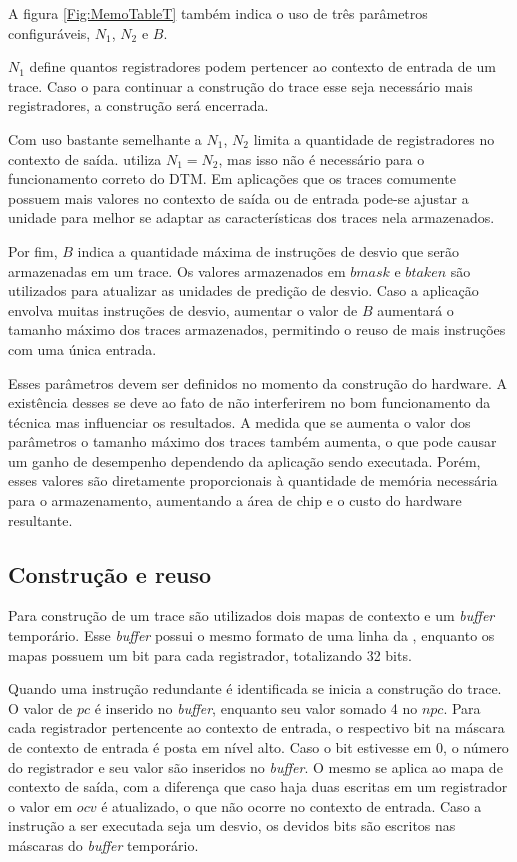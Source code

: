 A figura \ref{Fig:MemoTableT} também indica o uso de três parâmetros configuráveis, $N_{1}$, $N_{2}$ e $B$. 

$N_{1}$ define quantos registradores podem pertencer ao contexto de entrada de um trace. Caso o para continuar a construção do trace esse seja necessário mais registradores, a construção será encerrada. 

Com uso bastante semelhante a $N_{1}$, $N_{2}$ limita a quantidade de registradores no contexto de saída.  utiliza $N_{1} = N_{2}$, mas isso não é necessário para o funcionamento correto do DTM. Em aplicações que os traces comumente possuem mais valores no contexto de saída ou de entrada pode-se ajustar a unidade para melhor se adaptar as características dos traces nela armazenados. 

Por fim, $B$ indica a quantidade máxima de instruções de desvio que serão armazenadas em um trace. Os valores armazenados em $bmask$ e $btaken$ são utilizados para atualizar as unidades de predição de desvio. Caso a aplicação envolva muitas instruções de desvio, aumentar o valor de $B$ aumentará o tamanho máximo dos traces armazenados, permitindo o reuso de mais instruções com uma única entrada.

Esses parâmetros devem ser definidos no momento da construção do hardware. A existência desses se deve ao fato de não interferirem no bom funcionamento da técnica mas influenciar os resultados. A medida que se aumenta o valor dos parâmetros o tamanho máximo dos traces também aumenta, o que pode causar um ganho de desempenho dependendo da aplicação sendo executada. Porém, esses valores são diretamente proporcionais à quantidade de memória necessária para o armazenamento, aumentando a área de chip e o custo do hardware resultante.


\subsection{Construção e reuso}
\label{Fundamentacao:DTMHardware:Integracao}

Para construção de um trace são utilizados dois mapas de contexto e um \textit{buffer} temporário. Esse \textit{buffer} possui o mesmo formato de uma linha da \tablet, enquanto os mapas possuem um bit para cada registrador, totalizando 32 bits.

Quando uma instrução redundante é identificada se inicia a construção do trace. O valor de $pc$ é inserido no \textit{buffer}, enquanto seu valor somado 4 no $npc$. Para cada registrador pertencente ao contexto de entrada, o respectivo bit na máscara de contexto de entrada é posta em nível alto. Caso o bit estivesse em $0$, o número do registrador e seu valor são inseridos no \textit{buffer}. O mesmo se aplica ao mapa de contexto de saída, com a diferença que caso haja duas escritas em um registrador o valor em $ocv$ é atualizado, o que não ocorre no contexto de entrada. Caso a instrução a ser executada seja um desvio, os devidos bits são escritos nas máscaras do \textit{buffer} temporário. 

